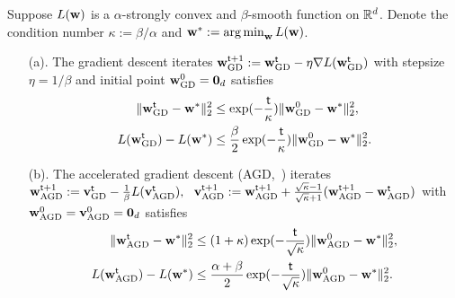\begin{proposition}\label{prop:conv_gd_agd}
Suppose $L({\mathbf w})$ is a $\alpha$-strongly convex and $\beta$-smooth function on $\mathbb{R}^d$. Denote the condition number $\kappa:=\beta/\alpha$ and ${\mathbf w}^*:=\operatorname*{arg\,min}_{{\mathbf w}}L({\mathbf w})$.
\begin{enumerate}
\item[(a).]
The gradient descent iterates ${\mathbf w}^{{\mathsf{t}}+1}_{{\mathrm{GD}}}:={\mathbf w}^{{\mathsf{t}}}_{{\mathrm{GD}}}-\eta\nabla L({\mathbf w}^{{\mathsf{t}}}_{{\mathrm{GD}}})$ with stepsize $\eta=1/\beta$ and initial point ${\mathbf w}^{0}_{{\mathrm{GD}}}={\mathbf 0}_d$ satisfies
\begin{align*}
    \|{\mathbf w}^{{\mathsf{t}}}_{{\mathrm{GD}}}-{\mathbf w}^*\|_2^2
    &\leq\exp(-\frac{{\mathsf{t}}}{\kappa}) \|{\mathbf w}^{0}_{{\mathrm{GD}}}-{\mathbf w}^*\|_2^2,
    \\
    L({\mathbf w}^{{\mathsf{t}}}_{{\mathrm{GD}}})-L({\mathbf w}^*)
    &\leq \frac{\beta}{2} \exp(-\frac{{\mathsf{t}}}{\kappa})\|{\mathbf w}^{0}_{{\mathrm{GD}}}-{\mathbf w}^*\|_2^2.
\end{align*}
    \item [(b).] 
    The accelerated gradient descent (AGD,~\cite{nesterov2003introductory}) iterates ${\mathbf w}^{{\mathsf{t}}+1}_{{\mathrm{AGD}}}:={\mathbf v}^{{\mathsf{t}}}_{{\mathrm{GD}}}-\frac{1}{\beta} L({\mathbf v}^{{\mathsf{t}}}_{{\mathrm{AGD}}}),~~ {\mathbf v}^{{\mathsf{t}}+1}_{{\mathrm{AGD}}}:={\mathbf w}^{{\mathsf{t}}+1}_{{\mathrm{AGD}}}+\frac{\sqrt{\kappa}-1}{\sqrt{\kappa}+1}({\mathbf w}^{{\mathsf{t}}+1}_{{\mathrm{AGD}}}-{\mathbf w}^{{\mathsf{t}}}_{{\mathrm{AGD}}})$ with ${\mathbf w}^{0}_{{\mathrm{AGD}}}={\mathbf v}^{0}_{{\mathrm{AGD}}}={\mathbf 0}_d$ satisfies
    \begin{align*}
    \|{\mathbf w}^{{\mathsf{t}}}_{{\mathrm{AGD}}}-{\mathbf w}^*\|_2^2
    &\leq(1+\kappa)\exp(-\frac{{\mathsf{t}}}{\sqrt{\kappa}}) \|{\mathbf w}^{0}_{{\mathrm{AGD}}}-{\mathbf w}^*\|_2^2,
    \\
    L({\mathbf w}^{{\mathsf{t}}}_{{\mathrm{AGD}}})-L({\mathbf w}^*)
    &\leq \frac{\alpha+\beta}{2} \exp(-\frac{{\mathsf{t}}}{\sqrt\kappa})\|{\mathbf w}^{0}_{{\mathrm{AGD}}}-{\mathbf w}^*\|_2^2.
\end{align*}
\end{enumerate}
    
\end{proposition}